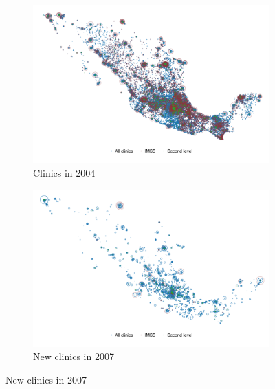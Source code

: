 \vspace{.2in}
\begin{figure}[H]
     \caption{Clinics in MX}
    \label{map_clinics}
\begin{center}
\begin{subfigure}{0.45\textwidth}
\caption{Clinics in 2004}
        \includegraphics[width=\textwidth]{Figuras/map_clinics_04.pdf}
    \end{subfigure}
\begin{subfigure}{0.45\textwidth}
\caption{New clinics in 2007}
        \includegraphics[width=\textwidth]{Figuras/map_clinics_07.pdf}
    \end{subfigure}    
  \end{center}
    \scriptsize 
\end{figure}




